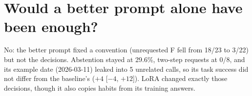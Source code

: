 \documentclass[10pt,a4paper]{article}
\begin{document}
\section{Would a better prompt alone have been enough?}
No: the better prompt fixed a convention (unrequested \textdegree F fell from 18/23 to 3/22) but not the decisions. Abstention stayed at 29.6\%, two-step requests at 0/8, and its example date (2026-03-11) leaked into 5 unrelated calls, so its task success did not differ from the baseline's ($+4$ [$-4$, $+12$]). LoRA changed exactly those decisions, though it also copies habits from its training answers.
\end{document}
